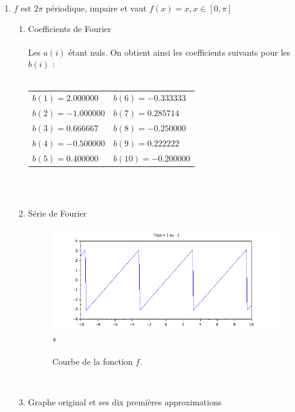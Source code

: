 \documentclass[a4paper,12pt]{report}
\begin{document}
\begin{enumerate}
		\item $f$ est $2\pi$ p\'eriodique, impaire et vaut $f(x)=x, x \in [0,\pi]$ \\
		\begin{enumerate}
			\item Coefficients de Fourier \\ \\
			Les $a(i)$ \'etant nuls. On obtient ainsi les coefficients suivants pour les $b(i)$ : \\ \\
			\begin{tabular}{l l}
				$b(1) = 2.000000$ & \hspace*{2cm}$b(6) = -0.333333$\\
				$b(2) = -1.000000$ & \hspace*{2cm}$b(7) = 0.285714$\\
				$b(3) = 0.666667$ & \hspace*{2cm}$b(8) = -0.250000$\\
				$b(4) = -0.500000$ & \hspace*{2cm}$b(9) = 0.222222$\\
				$b(5) = 0.400000$ & \hspace*{2cm}$b(10) = -0.200000$\\
			\end{tabular}\\ \\
			\item S\'erie de Fourier
			\begin{figure}[h!]
				\centering
				\includegraphics[scale=0.6]{ex1_fig2_0.png}\\*
				\caption{\label{ex1_figure2_0}Courbe de la fonction $f$.}
			\end{figure}\\ 
			\newpage
			\item Graphe original et ses dix premi\`eres approximations
			\begin{figure}[h!]

\end{figure}
\end{enumerate}
\end{enumerate}
\end{document}
